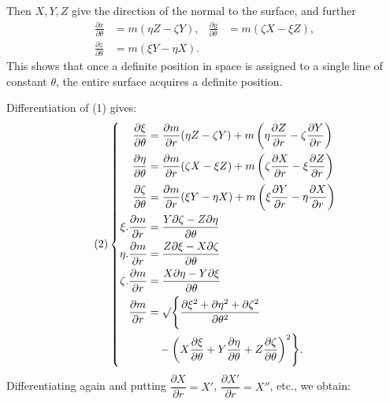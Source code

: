 %
\noindent Then $X,Y,Z$ give the direction of the normal to the surface, and further
\begin{equation}\tag{1}
\begin{aligned}
\frac{\partial x}{\partial\theta}&=m(\eta Z-\zeta Y),&\frac{\partial y}{\partial\theta}&=m(\zeta X-\xi Z),\\
\frac{\partial z}{\partial\theta}&=m(\xi Y-\eta X).
\end{aligned}
\end{equation}
\indent This shows that once a definite position in space is assigned to a single line of constant $\theta$, the entire surface acquires a definite position.

Differentiation of (1) gives:
\begin{equation}\tag{2}
\left\{\begin{aligned}
\frac{\partial\xi}{\partial\theta}&=\frac{\partial m}{\partial r}(\eta Z-\zeta Y)+m\left(\eta\frac{\partial Z}{\partial r}-\zeta\frac{\partial Y}{\partial r}\right)\\
\frac{\partial\eta}{\partial\theta}&=\frac{\partial m}{\partial r}(\zeta X-\xi Z)+m\left(\zeta\frac{\partial X}{\partial r}-\xi\frac{\partial Z}{\partial r}\right)\\
\frac{\partial\zeta}{\partial\theta}&=\frac{\partial m}{\partial r}(\xi Y-\eta X)+m\left(\xi\frac{\partial Y}{\partial r}-\eta\frac{\partial X}{\partial r}\right)\\
\xi.\frac{\partial m}{\partial r}&=\frac{Y\partial\zeta-Z\partial\eta}{\partial\theta}\\
\eta.\frac{\partial m}{\partial r}&=\frac{Z\partial\xi-X\partial\zeta}{\partial\theta}\\
\zeta.\frac{\partial m}{\partial r}&=\frac{X\partial\eta-Y\partial\xi}{\partial\theta}\\
\frac{\partial m}{\partial r}&=\mathord{\surd}\Biggl\{\frac{\partial\xi^2+\partial\eta^2+\partial\zeta^2}{\partial\theta^2}\\
&\quad-\left(X\frac{\partial\xi}{\partial\theta}+Y\frac{\partial\eta}{\partial\theta}+Z\frac{\partial\zeta}{\partial\theta}\right)^2\Biggr\}.
\end{aligned}\right.
\end{equation}
\indent Differentiating again and putting $\dfrac{\partial X}{\partial r}=X'$, $\dfrac{\partial X'}{\partial r}=X''$, etc., we obtain:

